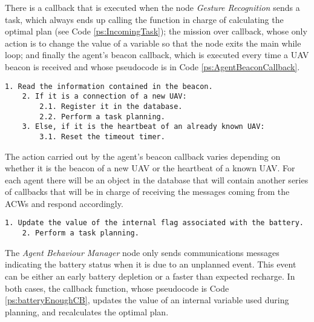There is a callback that is executed when the node \emph{Gesture Recognition} sends a task, which always ends up calling the function in charge of calculating the optimal plan (see Code \ref{ps:IncomingTask}); the mission over callback, whose only action is to change the value of a variable so that the node exits the main while loop; and finally the agent's beacon callback, which is executed every time a \gls{UAV} beacon is received and whose pseudocode is in Code \ref{ps:AgentBeaconCallback}.

\begin{lstlisting}[caption={Agent's beacon callback}, breaklines=true, label=ps:AgentBeaconCallback]
	1. Read the information contained in the beacon.
	2. If it is a connection of a new UAV:
		2.1. Register it in the database.
		2.2. Perform a task planning.
	3. Else, if it is the heartbeat of an already known UAV:
		3.1. Reset the timeout timer.
\end{lstlisting}

The action carried out by the agent's beacon callback varies depending on whether it is the beacon of a new \gls{UAV} or the heartbeat of a known \gls{UAV}. For each agent there will be an object in the database that will contain another series of callbacks that will be in charge of receiving the messages coming from the \glspl{ACW} and respond accordingly.

\begin{lstlisting}[caption={Callback that runs when an \emph{Agent Behaviour Manager} sends battery feedback}, breaklines=true, label=ps:batteryEnoughCB]
	1. Update the value of the internal flag associated with the battery.
	2. Perform a task planning.
\end{lstlisting}

The \emph{Agent Behaviour Manager} node only sends communications messages indicating the battery status when it is due to an unplanned event. This event can be either an early battery depletion or a faster than expected recharge. In both cases, the callback function, whose pseudocode is Code \ref{ps:batteryEnoughCB}, updates the value of an internal variable used during planning, and recalculates the optimal plan.

